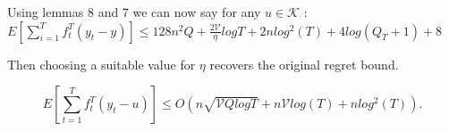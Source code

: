 Using lemmas 8 and 7 we can now say for any $u \in \mathcal{K}$  : \\

$E[ \sum_{i=1}^T f_t^T (y_t -y) ] \leq 128 n^2Q + \frac{2 \mathcal{V}}{\eta} logT 
+  2 nlog^2(T) + 4log(Q_T +1) + 8 $

Then choosing a suitable value for $\eta$ recovers the original regret bound.

\begin{equation}
E[\sum_{t=1}^T f_t^T (y_t - u)] \leq O(n \sqrt{\mathcal{V}Qlog T} + n \mathcal{V} log(T) + nlog^2(T)) . 
\end{equation}
